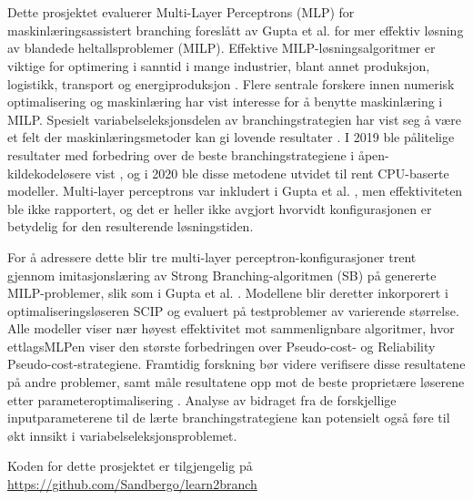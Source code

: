 \chapter*{\norwegianabstractname}
%
Dette prosjektet evaluerer Multi-Layer Perceptrons (MLP) for maskinlæringsassistert branching foreslått av Gupta et al. \cite{gupta2020hybrid} for mer effektiv løsning av blandede heltallsproblemer (\gls{MILP}). Effektive MILP-løsningsalgoritmer er viktige for optimering i sanntid i mange industrier, blant annet produksjon, logistikk, transport og energiproduksjon  \cite{junger2010years}. Flere sentrale forskere innen numerisk optimalisering og maskinlæring har vist interesse for å benytte maskinlæring i \gls{MILP}\cite{bengio2020machine,bertsimas2019online}. Spesielt variabelseleksjonsdelen av branchingstrategien har vist seg å være et felt der maskinlæringsmetoder kan gi lovende resultater \cite{khalil2020towards}. I 2019 ble pålitelige resultater med forbedring over de beste branchingstrategiene i åpen-kildekodeløsere vist \cite{gasse2019exact}, og i 2020 ble disse metodene utvidet til rent CPU-baserte modeller. Multi-layer perceptrons var inkludert i Gupta et al. \cite{gupta2020hybrid}, men effektiviteten ble ikke rapportert, og det er heller ikke avgjort hvorvidt konfigurasjonen er betydelig for den resulterende løsningstiden.

For å adressere dette blir tre multi-layer perceptron-konfigurasjoner trent gjennom imitasjonslæring av Strong Branching-algoritmen (\gls{SB}) på genererte \gls{MILP}-problemer, slik som i Gupta et al. \cite{gupta2020hybrid}. Modellene blir deretter inkorporert i optimaliseringsløseren \gls{SCIP} og evaluert på testproblemer av varierende størrelse. Alle modeller viser nær høyest effektivitet mot sammenlignbare algoritmer, hvor ettlags\gls{MLP}en viser den største forbedringen over Pseudo-cost- og Reliability Pseudo-cost-strategiene. Framtidig forskning bør videre verifisere disse resultatene på andre problemer, samt måle resultatene opp mot de beste proprietære løserene etter parameteroptimalisering \cite{hutter2010automated}. Analyse av bidraget fra de forskjellige inputparameterene til de lærte branchingstrategiene kan potensielt også føre til økt innsikt i variabelseleksjonsproblemet.

Koden for dette prosjektet er tilgjengelig på\\ \url{https://github.com/Sandbergo/learn2branch}
\clearpage

